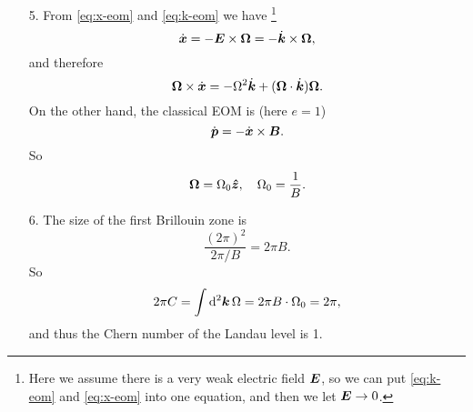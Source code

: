 \documentclass[hyperref, a4paper]{article}
\begin{document}
\begin{itemize}
\item[5.] From \eqref{eq:x-eom} and \eqref{eq:k-eom} we have%
\footnote{
    Here we assume there is a very weak electric field $\vb*{E}$,
    so we can put \eqref{eq:k-eom} and \eqref{eq:x-eom} into one equation,
    and then we let $\vb*{E} \to 0$.
}
\[
    \dot{\vb*{x}} = - \vb*{E} \times \vb*{\Omega} = - \dot{\vb*{k}} \times \vb*{\Omega}, 
\]
and therefore 
\begin{equation}
    \vb*{\Omega} \times \dot{\vb*{x}} = - \Omega^2 \dot{\vb*{k}} + (\vb*{\Omega} \cdot \dot{\vb*{k}}) \vb*{\Omega}.
    \label{eq:eom-iqhe}
\end{equation}
On the other hand, the classical EOM is (here $e = 1$)
\begin{equation}
    \dot{\vb*{p}} = - \dot{\vb*{x}} \times \vb*{B}.
\end{equation}
So 
\begin{equation}
    \vb*{\Omega} = \Omega_0 \vu*{z}, \quad \Omega_0 = \frac{1}{B}.
\end{equation}

\item[6.] The size of the first Brillouin zone is 
\[
    \frac{(2\pi)^2}{2\pi / B} = 2\pi B.
\]
So 
\[
    2\pi C = \int \dd[2]{\vb*{k}} \Omega = 2\pi B \cdot \Omega_0 = 2\pi,
\]
and thus the Chern number of the Landau level is 1.

\end{itemize}
\end{document}
